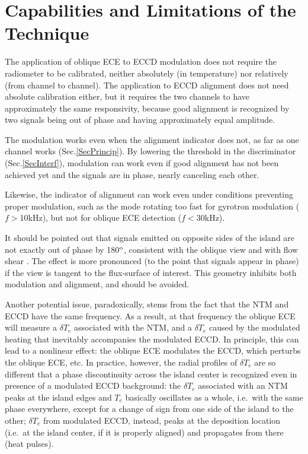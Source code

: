 \documentclass[aps,pra,twocolumn]{revtex4}
\begin{document}
\section{Capabilities and Limitations of the Technique}       \label{SecLimt}
The application of oblique ECE to ECCD modulation does not 
require the radiometer to be calibrated, neither absolutely (in temperature) 
nor relatively (from channel to channel). 
The application to ECCD alignment does not need absolute calibration either, 
but it requires the two channels to have approximately the same responsivity, 
because good alignment is recognized by two signals being out of 
phase and having approximately equal amplitude. 

The modulation works even when the alignment indicator does not, 
as far as one channel works (Sec.\ref{SecPrincip}). 
By lowering the threshold in the 
discriminator (Sec.\ref{SecInterf}), modulation can work even if 
good alignment has not been achieved yet and the signals are in phase, nearly 
canceling each other. 

Likewise, the indicator of alignment can work even under conditions 
preventing proper modulation, such as the mode rotating too fast for 
gyrotron modulation ($f>$10kHz), but not for oblique ECE detection ($f<$30kHz). 

It should be pointed out that signals emitted on opposite sides of the island 
are not exactly out of phase by 180$^{\rm o}$, consistent with the oblique 
view and with flow shear \cite{PoP}.
The effect is more pronounced (to the point that signals appear in phase) 
if the view is tangent to the flux-surface of interest. 
This geometry inhibits both modulation and alignment, and should be avoided. 

Another potential issue, paradoxically, stems from the fact that the
NTM and  ECCD have the  same frequency. As a result, at that frequency
the oblique ECE will  measure a $\delta T_e$ associated with the NTM,
and a $\delta T_e$ caused  by the modulated heating that inevitably
accompanies the modulated ECCD.  
In principle, this can lead to a nonlinear effect: 
the oblique ECE modulates the ECCD, which perturbs the oblique ECE, etc.
In practice, however, the radial profiles of $\delta T_e$ are so different 
that a phase discontinuity across the island center 
is recognized even in presence of a modulated ECCD background:  
the $\delta T_e$ associated with an NTM peaks at the island edges 
\cite{Rob_Rev} and  
$T_e$ basically oscillates as a whole, i.e.~with the same phase everywhere, 
except for a change of sign from one side of the island to the other; 
$\delta T_e$ from modulated ECCD, instead, peaks at the  
deposition location (i.e.~at the island center, if it is properly aligned) 
and propagates from there (heat pulses). 
\end{document}

